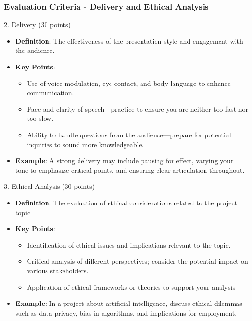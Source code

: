 \documentclass[aspectratio=169]{beamer}
\begin{document}
\begin{frame}[fragile]
    \frametitle{Evaluation Criteria - Delivery and Ethical Analysis}
    \begin{block}{2. Delivery (30 points)}
        \begin{itemize}
            \item \textbf{Definition}: The effectiveness of the presentation style and engagement with the audience.
            \item \textbf{Key Points}:
                \begin{itemize}
                    \item Use of voice modulation, eye contact, and body language to enhance communication.
                    \item Pace and clarity of speech—practice to ensure you are neither too fast nor too slow.
                    \item Ability to handle questions from the audience—prepare for potential inquiries to sound more knowledgeable.
                \end{itemize}
            \item \textbf{Example}: A strong delivery may include pausing for effect, varying your tone to emphasize critical points, and ensuring clear articulation throughout.
        \end{itemize}
    \end{block}

    \begin{block}{3. Ethical Analysis (30 points)}
        \begin{itemize}
            \item \textbf{Definition}: The evaluation of ethical considerations related to the project topic.
            \item \textbf{Key Points}:
                \begin{itemize}
                    \item Identification of ethical issues and implications relevant to the topic.
                    \item Critical analysis of different perspectives; consider the potential impact on various stakeholders.
                    \item Application of ethical frameworks or theories to support your analysis.
                \end{itemize}
            \item \textbf{Example}: In a project about artificial intelligence, discuss ethical dilemmas such as data privacy, bias in algorithms, and implications for employment.
        \end{itemize}
    \end{block}
\end{frame}
\end{document}
